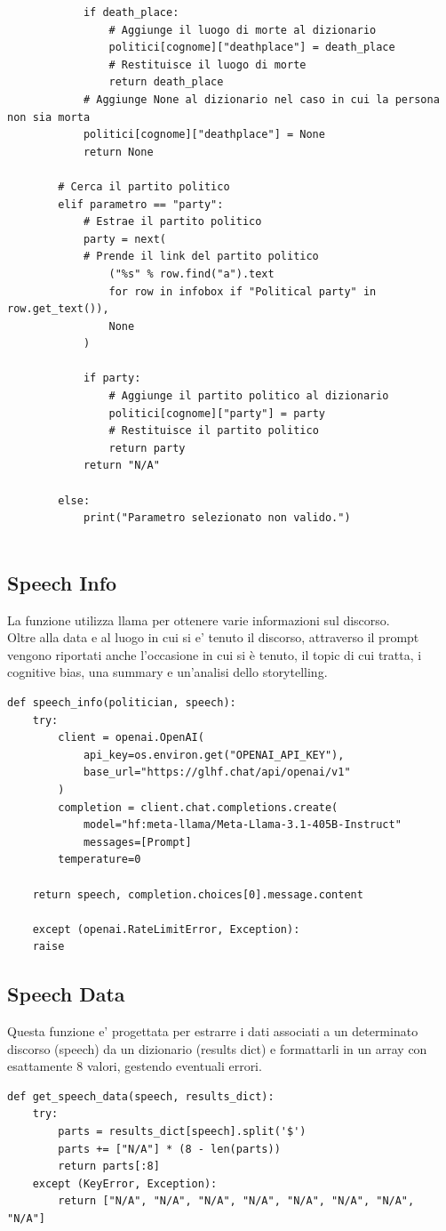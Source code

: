 \documentclass{article}
\begin{document}
\begin{lstlisting}
			if death_place:
				# Aggiunge il luogo di morte al dizionario
				politici[cognome]["deathplace"] = death_place
				# Restituisce il luogo di morte
				return death_place
			# Aggiunge None al dizionario nel caso in cui la persona non sia morta
			politici[cognome]["deathplace"] = None
			return None

		# Cerca il partito politico
		elif parametro == "party":
			# Estrae il partito politico
			party = next(
			# Prende il link del partito politico
				("%s" % row.find("a").text
				for row in infobox if "Political party" in row.get_text()), 
				None
			)

			if party:
				# Aggiunge il partito politico al dizionario
				politici[cognome]["party"] = party
				# Restituisce il partito politico
				return party
			return "N/A"

		else:
			print("Parametro selezionato non valido.")
	
		\end{lstlisting}

		\subsection{Speech Info}
La funzione utilizza llama per ottenere varie informazioni sul discorso.\\
Oltre alla data e al luogo in cui si e' tenuto il discorso, attraverso il prompt vengono riportati anche l'occasione in cui si è tenuto, il topic di cui tratta, i cognitive bias, una summary e un'analisi dello storytelling.
		\begin{lstlisting}
def speech_info(politician, speech):
	try:
		client = openai.OpenAI(
			api_key=os.environ.get("OPENAI_API_KEY"),
			base_url="https://glhf.chat/api/openai/v1"
		)
		completion = client.chat.completions.create(
			model="hf:meta-llama/Meta-Llama-3.1-405B-Instruct"
			messages=[Prompt]
		temperature=0
		
	return speech, completion.choices[0].message.content
	
	except (openai.RateLimitError, Exception):
	raise
		\end{lstlisting}

		\subsection{Speech Data}
		Questa funzione e' progettata per estrarre i dati associati a un determinato discorso (speech) da un dizionario (results dict) e formattarli in un array con esattamente 8 valori, gestendo eventuali errori.
		\begin{lstlisting}
def get_speech_data(speech, results_dict):
	try:
		parts = results_dict[speech].split('$')
		parts += ["N/A"] * (8 - len(parts))
		return parts[:8]
	except (KeyError, Exception):
		return ["N/A", "N/A", "N/A", "N/A", "N/A", "N/A", "N/A", "N/A"]

		\end{lstlisting}
		
\end{document}
